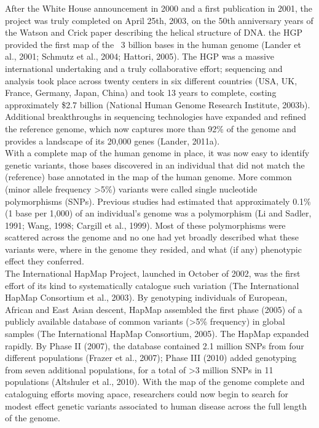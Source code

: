 After the White House announcement in 2000 and a first publication in 2001, the 
project was truly completed on April 25th, 2003, on the 50th anniversary years of the Watson and Crick paper describing the helical structure of DNA.
the HGP provided the first map of the ~3 billion bases in the human genome (Lander et al., 2001; Schmutz et al., 2004; Hattori, 2005). 
The HGP was a massive international undertaking and a truly collaborative effort; sequencing and analysis took place across twenty centers in six different countries (USA, UK, France, Germany, Japan, China) and took 13 years to complete, costing approximately \$2.7 billion (National Human Genome Research Institute, 2003b).\\ 

Additional breakthroughs in sequencing technologies have expanded and refined the reference genome, which now captures more than 92\% of the genome and provides a landscape of its 20,000 genes (Lander, 2011a).\\

With a complete map of the human genome in place, it was now easy to identify genetic
variants, those bases discovered in an individual that did not match the (reference) base
annotated in the map of the human genome. More common (minor allele frequency >5\%) variants were called single nucleotide polymorphisms (SNPs). 
Previous studies had estimated that approximately 0.1\% (1 base per 1,000) of an individual's genome was a polymorphism (Li and Sadler, 1991; Wang, 1998; Cargill et al., 1999). 
Most of these polymorphisms were scattered across the genome and no one had yet broadly described what these variants were, where in the genome they resided, and what (if any) phenotypic effect they conferred.\\

The International HapMap Project, launched in October of 2002, was the first effort of its
kind to systematically catalogue such variation (The International HapMap Consortium et al., 2003). 
By genotyping individuals of European, African and East Asian descent, HapMap assembled the first phase (2005) of a publicly available database of common variants (>5\% frequency) in global samples (The International HapMap Consortium, 2005). 
The HapMap expanded rapidly. 
By Phase II (2007), the database contained 2.1 million SNPs from four different populations (Frazer et al., 2007); Phase III (2010) added genotyping from seven additional populations, for a total of >3 million SNPs in 11 populations (Altshuler et al., 2010). 
With the map of the genome complete and cataloguing efforts moving apace, researchers could now begin to search for modest effect genetic variants associated to human disease across the full length of the genome.

